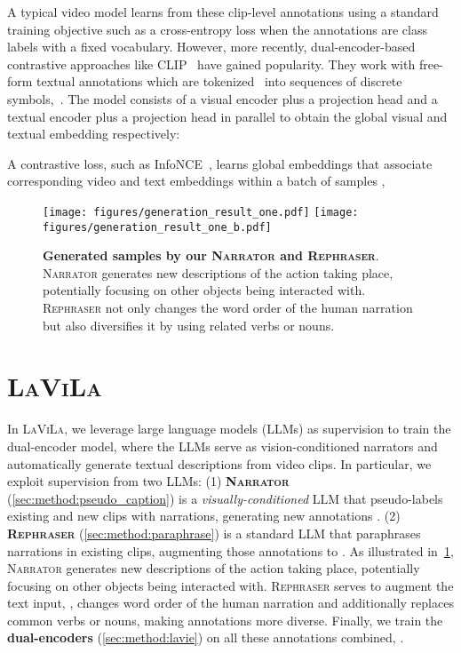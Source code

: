 \documentclass[10pt,twocolumn,letterpaper]{article}
\newcommand{\ours}{\textsc{LaViLa}\xspace}
\newcommand{\narrator}{\textsc{Narrator}\xspace}
\newcommand{\rephraser}{\textsc{Rephraser}\xspace}
\begin{document}
A typical video model  learns from these clip-level annotations using a standard training objective such as a cross-entropy loss when the annotations are class labels with a fixed vocabulary. However, more recently, dual-encoder-based contrastive approaches like CLIP~\cite{radford2021clip,xu2021videoclip} have gained popularity.
They work with free-form textual annotations which are tokenized~\cite{sennrich2016bpe} into sequences of discrete symbols,~\ie .
The model consists of a visual encoder  plus a projection head  and a textual encoder  plus a projection head  in parallel to obtain the global visual and textual embedding respectively:
{\small

}
A contrastive loss, such as InfoNCE~\cite{oord2018cpc}, learns global embeddings that associate corresponding video and text embeddings within a batch of samples ,
{\small

}


\begin{figure}
	\centering
	\texttt{[image: figures/generation\_result\_one.pdf]}
	\texttt{[image: figures/generation\_result\_one\_b.pdf]}
	\caption{
		\textbf{Generated samples by our \narrator and \rephraser}.
		\narrator generates new descriptions of the action taking place, potentially focusing on other objects being interacted with.
		\rephraser not only changes the word order of the human narration but also diversifies it by using related verbs or nouns.
	}
	\label{fig:qual}
\end{figure}


\section{\ours}

In \ours, we leverage large language models (LLMs) as supervision to train the dual-encoder model, where the LLMs serve as vision-conditioned narrators and automatically generate textual descriptions from video clips.
In particular, we exploit supervision from two LLMs:
(1) {\bf \narrator} (\cref{sec:method:pseudo_caption}) is a {\em visually-conditioned} LLM that pseudo-labels existing and new clips with narrations, generating new annotations .
(2) {\bf \rephraser} (\cref{sec:method:paraphrase}) is a standard LLM that paraphrases narrations in existing clips, augmenting those annotations to .
As illustrated in~\cref{fig:qual}, \narrator generates new descriptions of the action taking place, potentially focusing on other objects being interacted with.
\rephraser serves to augment the text input, \eg, changes word order of the human narration and additionally replaces common verbs or nouns, making annotations more diverse.
Finally, we train the {\bf dual-encoders} (\cref{sec:method:lavie}) on all these annotations combined,
\ie .
\end{document}
